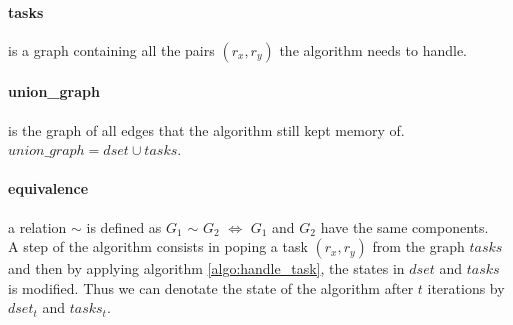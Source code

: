 \documentclass[12px]{article}
\begin{document}
    \paragraph{tasks} is a graph containing all the pairs $(r_x, r_y)$ the algorithm needs to handle.

    \paragraph{union\_graph} is the graph of all edges that the algorithm still kept memory of. $union\_graph = dset \cup tasks$.

    \paragraph{equivalence} a relation $\sim$ is defined as $G_1$ $\sim$ $G_2$ $\Leftrightarrow$ $G_1$ and $G_2$ have the same components. \\

    A step of the algorithm consists in poping a task $(r_x, r_y)$ from the graph $tasks$ and then by applying algorithm \ref{algo:handle_task}, the states in $dset$ and $tasks$ is modified.
    Thus we can denotate the state of the algorithm after $t$ iterations by $dset_t$ and $tasks_t$.
\end{document}
